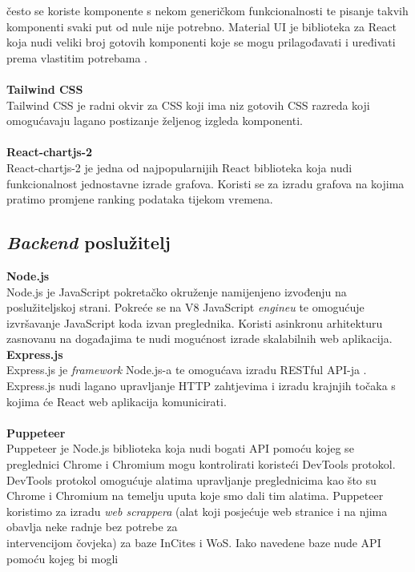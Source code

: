 \documentclass[times, utf8, zavrsni]{fer}
\begin{document}
često se koriste komponente s nekom generičkom funkcionalnosti te pisanje takvih komponenti svaki put od nule nije potrebno. 
Material UI je biblioteka za React koja nudi veliki broj gotovih komponenti koje se mogu prilagođavati i uređivati prema vlastitim potrebama .
\\
\\ \textbf{Tailwind CSS}
\\ Tailwind CSS je radni okvir  za CSS  koji ima niz gotovih CSS razreda koji omogućavaju lagano postizanje 
željenog izgleda komponenti.
\\
\\ \textbf{React-chartjs-2}
\\ React-chartjs-2 je jedna od najpopularnijih React biblioteka koja nudi funkcionalnost jednostavne izrade grafova. Koristi se za izradu grafova na 
kojima pratimo promjene ranking podataka tijekom vremena.
\\ \subsection{\emph{Backend} poslužitelj}
\textbf{Node.js} 
\\ Node.js je JavaScript pokretačko okruženje  namijenjeno izvođenju na poslužiteljskoj strani. Pokreće se na V8 JavaScript \emph{engineu}
te omogućuje izvršavanje JavaScript koda izvan preglednika. Koristi asinkronu arhitekturu zasnovanu na događajima 
te nudi mogućnost izrade skalabilnih web aplikacija.\\\newpage \textbf{Express.js}
\\ Express.js je \emph{framework} Node.js-a te omogućava izradu RESTful API-ja . Express.js nudi
lagano upravljanje HTTP zahtjevima i izradu krajnjih točaka  s kojima će React web aplikacija komunicirati.
\\ \\ \textbf{Puppeteer}
\\ Puppeteer je Node.js biblioteka koja nudi bogati API pomoću kojeg se preglednici Chrome i Chromium mogu kontrolirati koristeći DevTools protokol.
DevTools protokol omogućuje alatima upravljanje preglednicima kao što su Chrome i Chromium na temelju uputa koje smo dali tim alatima.
Puppeteer koristimo za izradu \emph{web scrappera} (alat koji posjećuje web stranice i 
na njima obavlja neke radnje bez potrebe za \\intervencijom čovjeka) za baze InCites i WoS. Iako navedene baze nude API pomoću kojeg bi mogli 
\end{document}
